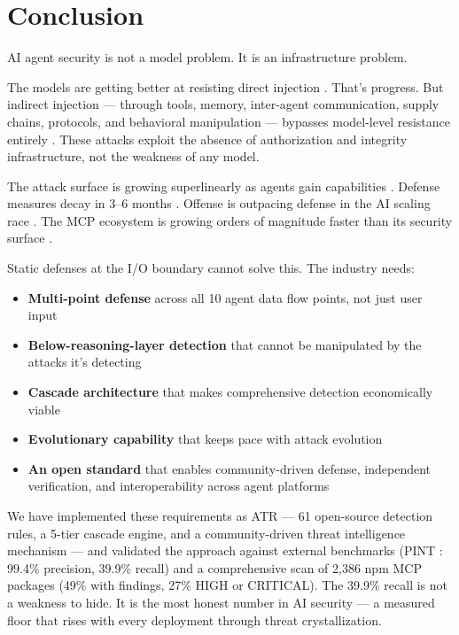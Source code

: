 \documentclass[11pt,letterpaper]{article}
\begin{document}
\section{Conclusion}
\label{sec:conclusion}

AI agent security is not a model problem. It is an infrastructure problem.

The models are getting better at resisting direct injection \cite{grayswan,anthropicrates}. That's progress. But indirect injection --- through tools, memory, inter-agent communication, supply chains, protocols, and behavioral manipulation --- bypasses model-level resistance entirely \cite{minja,invariant,sandworm,cve6514}. These attacks exploit the absence of authorization and integrity infrastructure, not the weakness of any model.

The attack surface is growing superlinearly as agents gain capabilities \cite{kim2026}. Defense measures decay in 3--6 months \cite{anthropicrates,checkmarx}. Offense is outpacing defense in the AI scaling race \cite{aisafety}. The MCP ecosystem is growing orders of magnitude faster than its security surface \cite{gartner,checkmarx}.

Static defenses at the I/O boundary cannot solve this. The industry needs:

\begin{itemize}
\item \textbf{Multi-point defense} across all 10 agent data flow points, not just user input
\item \textbf{Below-reasoning-layer detection} that cannot be manipulated by the attacks it's detecting
\item \textbf{Cascade architecture} that makes comprehensive detection economically viable
\item \textbf{Evolutionary capability} that keeps pace with attack evolution
\item \textbf{An open standard} that enables community-driven defense, independent verification, and interoperability across agent platforms
\end{itemize}

We have implemented these requirements as ATR \cite{atr} --- 61 open-source detection rules, a 5-tier cascade engine, and a community-driven threat intelligence mechanism --- and validated the approach against external benchmarks (PINT \cite{pint}: 99.4\% precision, 39.9\% recall) and a comprehensive scan of 2,386 npm MCP packages \cite{atrscan} (49\% with findings, 27\% HIGH or CRITICAL). The 39.9\% recall is not a weakness to hide. It is the most honest number in AI security --- a measured floor that rises with every deployment through threat crystallization.
\end{document}
